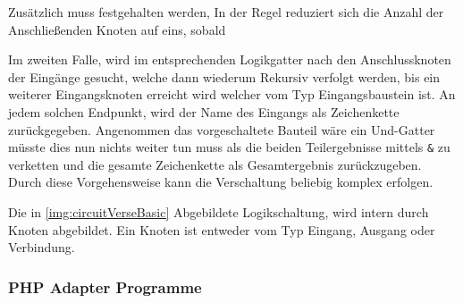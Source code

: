   Zusätzlich muss festgehalten werden,  In der Regel reduziert sich die Anzahl der Anschließenden Knoten auf eins, sobald 
 
 Im zweiten Falle, wird im entsprechenden Logikgatter nach den Anschlussknoten der Eingänge gesucht, welche dann wiederum Rekursiv verfolgt werden, bis ein weiterer Eingangsknoten erreicht wird welcher vom Typ Eingangsbaustein ist. An jedem solchen Endpunkt, wird der Name des Eingangs als Zeichenkette zurückgegeben. Angenommen das vorgeschaltete Bauteil wäre ein Und-Gatter müsste dies nun nichts weiter tun muss als die beiden Teilergebnisse mittels \texttt{\&} zu verketten und die gesamte Zeichenkette als Gesamtergebnis zurückzugeben. Durch diese Vorgehensweise kann die Verschaltung beliebig komplex erfolgen. 




Die in \autoref{img:circuitVerseBasic} Abgebildete Logikschaltung, wird intern durch Knoten abgebildet. Ein Knoten ist entweder vom Typ Eingang, Ausgang oder Verbindung. 




\subsubsection{PHP Adapter Programme}

 
\clearpage
